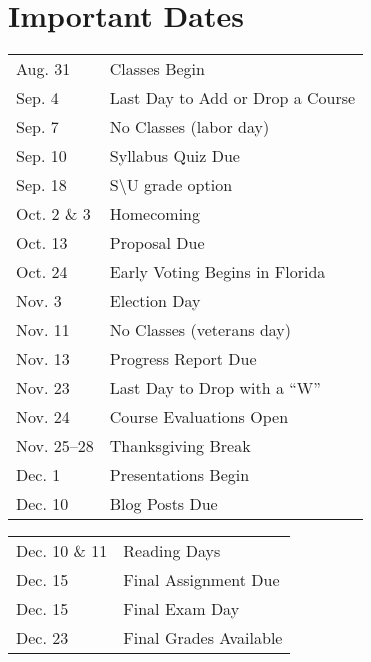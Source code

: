 \documentclass[11pt]{article}
\def\doubleq#1{``#1''}
\begin{document}
\section{Important Dates}
\begin{table}[H]
\centering
\begin{tabular}{ l l}
Aug. 31 & Classes Begin \\
Sep. 4 & Last Day to Add or Drop a Course \\
Sep. 7 & No Classes (labor day) \\
Sep. 10 & Syllabus Quiz Due \\
Sep. 18 & S\textbackslash U grade option \\
Oct. 2 \& 3 & Homecoming \\
Oct. 13 & Proposal Due \\
Oct. 24 & Early Voting Begins in Florida \\
Nov. 3 & Election Day \\
Nov. 11 & No Classes (veterans day) \\
Nov. 13 & Progress Report Due \\
Nov. 23 & Last Day to Drop with a \doubleq{W} \\
Nov. 24 & Course Evaluations Open \\
Nov. 25--28 & Thanksgiving Break \\
Dec. 1 & Presentations Begin \\
Dec. 10 & Blog Posts Due \\
\end{tabular}
\end{table}
\newpage
\begin{table}[H]
\centering
\begin{tabular}{ l l}

Dec. 10 \& 11 & Reading Days \\
Dec. 15 & Final Assignment Due \\
Dec. 15 & Final Exam Day\\
Dec. 23 & Final Grades Available \\
\end{tabular}
\end{table}
\newpage
\end{document}
